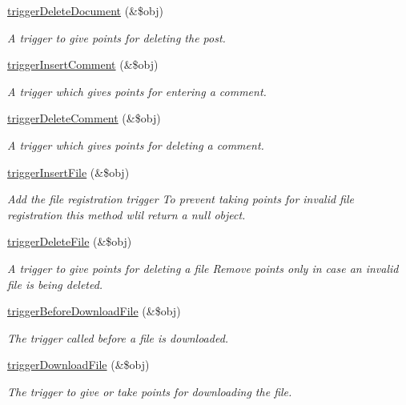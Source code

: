 \begin{DoxyCompactItemize}
\hyperlink{classpointController_a12526b69a68224eccbb3816e8724e4a4}{trigger\+Delete\+Document} (\&\$obj)
\begin{DoxyCompactList}\small\item\em A trigger to give points for deleting the post. \end{DoxyCompactList}\item 
\hyperlink{classpointController_adfd5758c92bb06d2b77ccc3ac432f0c1}{trigger\+Insert\+Comment} (\&\$obj)
\begin{DoxyCompactList}\small\item\em A trigger which gives points for entering a comment. \end{DoxyCompactList}\item 
\hyperlink{classpointController_ac6e1679b70da98f95a3a6cfe190a96f2}{trigger\+Delete\+Comment} (\&\$obj)
\begin{DoxyCompactList}\small\item\em A trigger which gives points for deleting a comment. \end{DoxyCompactList}\item 
\hyperlink{classpointController_a48e790691506d5c5a6feac45e7237e3d}{trigger\+Insert\+File} (\&\$obj)
\begin{DoxyCompactList}\small\item\em Add the file registration trigger To prevent taking points for invalid file registration this method wlil return a null object. \end{DoxyCompactList}\item 
\hyperlink{classpointController_a1d303c7b8ada6f84e53b5d32336bc313}{trigger\+Delete\+File} (\&\$obj)
\begin{DoxyCompactList}\small\item\em A trigger to give points for deleting a file Remove points only in case an invalid file is being deleted. \end{DoxyCompactList}\item 
\hyperlink{classpointController_afa504365e28861dc15a905c46e1f29e3}{trigger\+Before\+Download\+File} (\&\$obj)
\begin{DoxyCompactList}\small\item\em The trigger called before a file is downloaded. \end{DoxyCompactList}\item 
\hyperlink{classpointController_ab6a0e04cef3ea03a427a505ed829c027}{trigger\+Download\+File} (\&\$obj)
\begin{DoxyCompactList}\small\item\em The trigger to give or take points for downloading the file. \end{DoxyCompactList}\item 

\end{DoxyCompactItemize}
